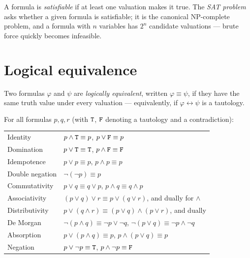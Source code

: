 \begin{definition}[Satisfiability]
A formula is \emph{satisfiable} if at least one valuation makes it true. The
\emph{SAT problem} asks whether a given formula is satisfiable; it is the
canonical NP-complete problem, and a formula with $n$ variables has $2^n$
candidate valuations --- brute force quickly becomes infeasible.
\end{definition}

\section{Logical equivalence}

\begin{definition}
Two formulas $\varphi$ and $\psi$ are \emph{logically equivalent}, written
$\varphi \equiv \psi$, if they have the same truth value under every valuation
--- equivalently, if $\varphi \leftrightarrow \psi$ is a tautology.
\end{definition}

\begin{theorem}\label{thm:laws}
For all formulas $p, q, r$ (with $\mathtt{T}$, $\mathtt{F}$ denoting a tautology and a
contradiction):
\begin{center}
\begin{tabular}{ll}
\toprule
Identity & $p \wedge \mathtt{T} \equiv p$, \quad $p \vee \mathtt{F} \equiv p$\\
Domination & $p \vee \mathtt{T} \equiv \mathtt{T}$, \quad $p \wedge \mathtt{F} \equiv \mathtt{F}$\\
Idempotence & $p \vee p \equiv p$, \quad $p \wedge p \equiv p$\\
Double negation & $\neg(\neg p) \equiv p$\\
Commutativity & $p \vee q \equiv q \vee p$, \quad $p \wedge q \equiv q \wedge p$\\
Associativity & $(p \vee q) \vee r \equiv p \vee (q \vee r)$, and dually for $\wedge$\\
Distributivity & $p \vee (q \wedge r) \equiv (p \vee q) \wedge (p \vee r)$, and dually\\
De Morgan & $\neg(p \wedge q) \equiv \neg p \vee \neg q$, \quad
             $\neg(p \vee q) \equiv \neg p \wedge \neg q$\\
Absorption & $p \vee (p \wedge q) \equiv p$, \quad $p \wedge (p \vee q) \equiv p$\\
Negation & $p \vee \neg p \equiv \mathtt{T}$, \quad $p \wedge \neg p \equiv \mathtt{F}$\\
\bottomrule
\end{tabular}
\end{center}
\end{theorem}

